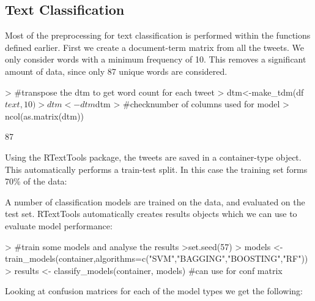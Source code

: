 \documentclass[10pt]{article}
\begin{document}
\subsection{Text Classification}
Most of the preprocessing for text classification is performed within the functions defined earlier. First we create a document-term matrix from all the tweets. We only consider words with a minimum frequency of 10. This removes a significant amount of data, since only 87 unique words are considered.

\begin{Schunk}
\begin{Sinput}
> #transpose the dtm to get word count for each tweet
> dtm<-make_tdm(df$text,10)
> dtm<-dtm$dtm
> #checknumber of columns used for model
> ncol(as.matrix(dtm))
\end{Sinput}
\begin{Soutput}
[1] 87
\end{Soutput}
\end{Schunk}
Using the RTextTools package, the tweets are saved in a container-type object. This automatically performs a train-test split. In this case the training set forms 70\% of the data:
\begin{Schunk}
\end{Schunk}
A number of classification models are trained on the data, and evaluated on the test set. RTextTools automatically creates results objects which we can use to evaluate model performance:
\begin{Schunk}
\begin{Sinput}
> #train some models and analyse the results
>set.seed(57)
> models <- train_models(container,algorithms=c("SVM","BAGGING","BOOSTING","RF"))
> results <- classify_models(container, models) #can use for conf matrix

\end{Sinput}
\end{Schunk}
Looking at confusion matrices for each of the model types we get the following:
\end{document}
